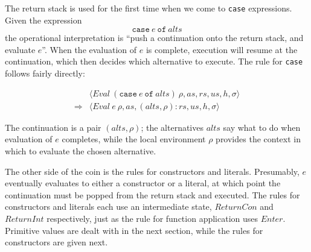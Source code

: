 \documentclass[10pt,a4paper]{exam} %
\begin{document}
The return stack is used for the first time when we come to \texttt{case} expressions. Given the expression
\begin{displaymath}
\texttt{case}~e~\texttt{of}~\mathit{alts}
\end{displaymath}
the operational interpretation is ``push a continuation onto the return stack, and evaluate $e$''. When the evaluation of $e$ is complete, execution will resume at the continuation, which then decides which alternative to execute. The rule for \texttt{case} follows fairly directly:
\begin{mdframed}
\begin{equation}
\begin{array}{cl}
 & \langle \mathit{Eval}~(\texttt{case}~e~\texttt{of}~\mathit{alts})~\rho, \mathit{as}, \mathit{rs}, \mathit{us}, h, \sigma \rangle \\[0.25cm]
\Longrightarrow & \langle \mathit{Eval}~e~\rho, \mathit{as}, (\mathit{alts}, \rho) : \mathit{rs}, \mathit{us}, h, \sigma \rangle 
\end{array}
\end{equation}
\end{mdframed}
The continuation is a pair $(\mathit{alts}, \rho)$; the alternatives $\mathit{alts}$ say what to do when evaluation of $e$ completes, while the local environment $\rho$ provides the context in which to evaluate the chosen alternative. 

The other side of the coin is the rules for constructors and literals. Presumably, $e$ eventually evaluates to either a constructor or a literal, at which point the continuation must be popped from the return stack and executed. The rules for constructors and literals each use an intermediate state, $\mathit{ReturnCon}$ and $\mathit{ReturnInt}$ respectively, just as the rule for function application uses $\mathit{Enter}$. Primitive values are dealt with in the next section, while the rules for constructors are given next.
\end{document}

